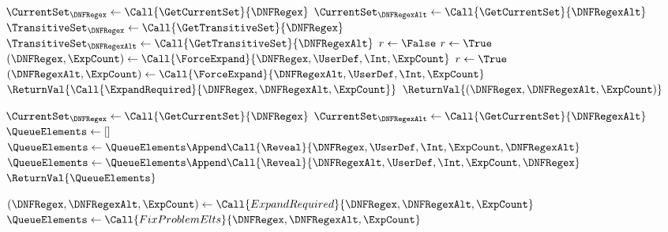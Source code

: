 \documentclass[sigplan,acmsmall]{acmart}
\begin{document}
\paragraph*{\Expand}
\begin{algorithm}
  \caption{\Expand{}}
  \label{alg:synthlens2}
  \begin{multicols}{2}
  \begin{algorithmic}[1]
    \State $\CurrentSet_{\DNFRegex} \gets \Call{\GetCurrentSet}{\DNFRegex}$
    \State $\CurrentSet_{\DNFRegexAlt} \gets \Call{\GetCurrentSet}{\DNFRegexAlt}$
    \State $\TransitiveSet_{\DNFRegex} \gets \Call{\GetTransitiveSet}{\DNFRegex}$
    \State $\TransitiveSet_{\DNFRegexAlt} \gets
    \Call{\GetTransitiveSet}{\DNFRegexAlt}$
    \State $r \gets \False$
    \ForEach{$(\UserDef, \Int)$}{$\CurrentSet_{\DNFRegex} \setminus
      \TransitiveSet_{\DNFRegexAlt}$}
    \State $r \gets \True$
    \State $(\DNFRegex,\ExpCount) \gets \Call{\ForceExpand}{\DNFRegex,\UserDef,\Int,\ExpCount}$
    \EndForEach
    \ForEach{$(\UserDef, \Int)$}{$\CurrentSet_{\DNFRegexAlt} \setminus
      \TransitiveSet_{\DNFRegex}$}
    \State $r \gets \True$
    \State $(\DNFRegexAlt,\ExpCount) \gets \Call{\ForceExpand}{\DNFRegexAlt,\UserDef,\Int,\ExpCount}$
    \EndForEach
    \State $\ReturnVal{\Call{\ExpandRequired}{\DNFRegex,\DNFRegexAlt,\ExpCount}}$
    \EndIf
    \State $\ReturnVal{(\DNFRegex,\DNFRegexAlt,\ExpCount)}$
    \EndFunction

    \Statex
    
    \State $\CurrentSet_{\DNFRegex} \gets \Call{\GetCurrentSet}{\DNFRegex}$
    \State $\CurrentSet_{\DNFRegexAlt} \gets
    \Call{\GetCurrentSet}{\DNFRegexAlt}$
    \State $\QueueElements \gets []$
      \ForEach{$(\UserDef, \Int)$}{$\CurrentSet_{\DNFRegexAlt} \setminus
      \CurrentSet_{\DNFRegex}$}
    \State $\QueueElements \gets \QueueElements \Append \Call{\Reveal}{\DNFRegex,\UserDef,\Int,\ExpCount,\DNFRegexAlt}$
    \EndForEach
    \ForEach{$(\UserDef, \Int)$}{$\CurrentSet_{\DNFRegex} \setminus
      \CurrentSet_{\DNFRegexAlt}$}
    \State $\QueueElements \gets \QueueElements \Append \Call{\Reveal}{\DNFRegexAlt,\UserDef,\Int,\ExpCount,\DNFRegex}$
    \EndForEach
    \State $\ReturnVal{\QueueElements}$
    \EndFunction

    \Statex
    
    \State $(\DNFRegex,\DNFRegexAlt,\ExpCount) \gets
    \Call{ExpandRequired}{\DNFRegex,\DNFRegexAlt,\ExpCount}$
    \State $\QueueElements \gets
    \Call{FixProblemElts}{\DNFRegex,\DNFRegexAlt,\ExpCount}$
    \Switch{\QueueElements}
    \CaseTwo {[]}{$\ReturnVal{\Call{\ExpandOnce}{\DNFRegex,\DNFRegexAlt,\ExpCount}}$}
    \EndCaseTwo
    \CaseTwo {\_}{$\ReturnVal{\QueueElements}$}
    \EndCaseTwo
    \EndSwitch
    \EndFunction
  \end{algorithmic}
  \end{multicols}
\end{algorithm}
\end{document}
